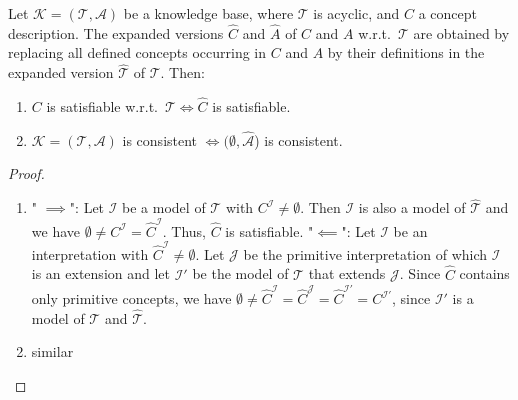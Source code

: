 \begin{prop}
Let  $\mathcal{K} = (\mathcal{T}, \mathcal{A})$ be a knowledge base, where $\mathcal{T}$ is acyclic, and $C$ a concept description.
The expanded versions $\widehat{C}$ and $\widehat{A}$ of $C$ and $A$ w.r.t.\ $\mathcal{T}$ are obtained by
replacing all defined concepts occurring in $C$ and $A$ by their definitions in the expanded version $\widehat{\mathcal{T}}$ of $\mathcal{T}$.
Then:
	\begin{enumerate}
		\item $C$ is satisfiable w.r.t.\ $\mathcal{T} \iff \widehat{C}$ is satisfiable.
		\item $\mathcal{K} = (\mathcal{T},\mathcal{A})$ is consistent $\iff (\emptyset,\widehat{\mathcal{A}}$) is consistent.
	\end{enumerate}
\end{prop}
\begin{proof}
	\begin{enumerate}
		\item " $\implies$":\newline
			Let $\mathcal{I}$ be a model of $\mathcal{T}$ with $C^\mathcal{I} \neq \emptyset$.
			Then $\mathcal{I}$ is also a model of $\widehat{\mathcal{T}}$ and we have $\emptyset \neq C^\mathcal{I} = \widehat{C}^\mathcal{I}$.
			Thus, $\widehat{C}$ is satisfiable. \newline
			"$\impliedby$": \newline
			Let $\mathcal{I}$ be an interpretation with $\widehat{C}^{\mathcal{I}} \neq \emptyset$.
			Let $\mathcal{J}$ be the primitive interpretation of which $\mathcal{I}$ is an extension
			and let $\mathcal{I}'$ be the model of $\mathcal{T}$ that extends $\mathcal{J}$.
			Since $\widehat{C}$ contains only primitive concepts,
			we have $\emptyset \neq \widehat{C}^{\mathcal{I}} = \widehat{C}^\mathcal{J} = \widehat{C}^{\mathcal{I'}} = C^{\mathcal{I'}}$,
			since $\mathcal{I}'$ is a model of $\mathcal{T}$ and $\widehat{\mathcal{T}}$.
		\item similar
			\qedhere
	\end{enumerate}
\end{proof}
